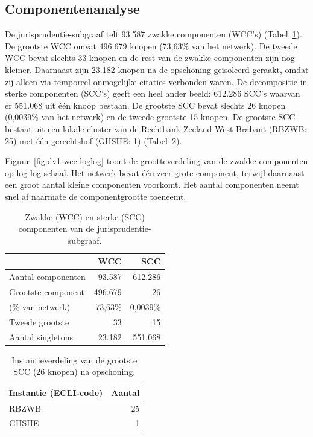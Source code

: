 \documentclass[a4paper, 12pt]{report}
\begin{document}
\subsection{Componentenanalyse} 
De jurisprudentie-subgraaf telt 93.587 zwakke componenten (WCC's) (Tabel~\ref{tab:dv1-componenten}). De grootste WCC omvat 496.679 knopen (73,63\% van het netwerk). De tweede WCC bevat slechts 33 knopen en de rest van de zwakke componenten zijn nog kleiner. Daarnaast zijn 23.182 knopen na de opschoning geïsoleerd geraakt, omdat zij alleen via temporeel onmogelijke citaties verbonden waren. De decompositie in sterke componenten (SCC's) geeft een heel ander beeld: 612.286 SCC's waarvan er 551.068 uit één knoop bestaan. De grootste SCC bevat slechts 26 knopen (0,0039\% van het netwerk) en de tweede grootste 15 knopen. De grootste SCC bestaat uit een lokale cluster van de Rechtbank Zeeland-West-Brabant (RBZWB: 25) met één gerechtshof (GHSHE: 1) (Tabel~\ref{tab:dv1-scc-instanties}).

Figuur~\ref{fig:dv1-wcc-loglog} toont de grootteverdeling van de zwakke componenten op log-log-schaal. Het netwerk bevat één zeer grote component, terwijl daarnaast een groot aantal kleine componenten voorkomt. Het aantal componenten neemt snel af naarmate de componentgrootte toeneemt.


\begin{table}[ht]
  \centering
  \caption{Zwakke (WCC) en sterke (SCC) componenten van de jurisprudentie-subgraaf.}
  \label{tab:dv1-componenten}
  \begin{tabular}{lrr}
    \toprule
     & WCC & SCC \\
    \midrule
    Aantal componenten      & 93.587   & 612.286 \\
    Grootste component      & 496.679  & 26 \\
    \quad (\% van netwerk)  & 73,63\%  & 0,0039\% \\
    Tweede grootste         & 33       & 15 \\
    Aantal singletons       & 23.182   & 551.068 \\
    \bottomrule
  \end{tabular}
\end{table}

\begin{table}[ht]
  \centering
  \caption{Instantieverdeling van de grootste SCC (26 knopen) na opschoning.}
  \label{tab:dv1-scc-instanties}
  \begin{tabular}{lr}
    \toprule
    Instantie (ECLI-code) & Aantal \\
    \midrule
    RBZWB & 25 \\
    GHSHE & 1 \\
    \bottomrule
  \end{tabular}
\end{table}
\end{document}
